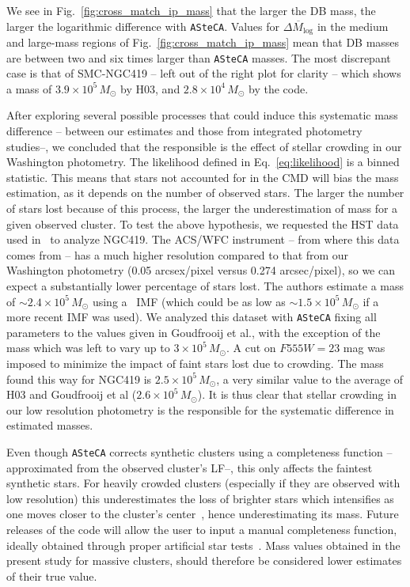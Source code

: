 \documentclass[draft]{aa}
\begin{document}
We see in Fig.~\ref{fig:cross_match_ip_mass} that
the larger the DB mass, the larger the logarithmic difference with
\texttt{ASteCA}. Values for $\overline{\Delta M_{\log}}$ in the medium and
large-mass regions of Fig.~\ref{fig:cross_match_ip_mass} mean that DB masses are
between two and six times larger than \texttt{ASteCA} masses.
%
The most discrepant case is that of SMC-NGC419 -- left out of
the right plot for clarity -- which shows a mass of $3.9{\times}10^5\,M_{\odot}$
by H03, and $2.8{\times}10^4\,M_{\odot}$ by the code.

After exploring several possible processes that could induce this systematic
mass difference -- between our estimates and those from integrated photometry
studies--, we concluded that the responsible is the effect of stellar crowding
in our Washington photometry.
%
The likelihood defined in Eq.~\ref{eq:likelihood} is a binned statistic. This
means that stars not accounted for in the CMD will bias the mass estimation,
as it depends on the number of observed stars. The larger the number of stars
lost because of this process, the larger the underestimation of mass for a given
observed cluster.
%
To test the above hypothesis, we requested the HST data used
in~\cite{Goudfrooij_2014} to analyze NGC419. The ACS/WFC instrument -- from
where this data comes from -- has a much higher resolution compared to that from
our Washington photometry (0.05 arcsex/pixel versus 0.274 arcsec/pixel), so we
can expect a substantially lower percentage of stars lost.
The authors estimate a mass of ${\sim}2.4{\times}10^5\,M_{\odot}$ using
a~\cite{Salpeter_1955} IMF (which could be as low as
${\sim}1.5{\times}10^5\,M_{\odot}$ if a more recent IMF was used).
We analyzed this dataset with \texttt{ASteCA} fixing all parameters to the
values given in Goudfrooij et al., with the exception of the
mass which was left to vary up to $3{\times}10^5\,M_{\odot}$. A cut on $F555W
{=}23$ mag was imposed to minimize the impact of faint stars lost due to
crowding.
%
The mass found this way for NGC419 is $2.5{\times}10^5\,M_{\odot}$, a
very similar value to the average of H03 and Goudfrooij et al
($2.6{\times}10^5\,M_{\odot}$).
%
It is thus clear that stellar crowding in our low resolution photometry is the
responsible for the systematic difference in estimated masses.

Even though \texttt{ASteCA} corrects synthetic clusters using a
completeness function -- approximated from the observed cluster's LF--, this
only affects the faintest synthetic stars. For heavily crowded clusters 
(especially if they are observed with low resolution) this underestimates the
loss of brighter stars which intensifies as one moves closer to the
cluster's center~\citep{Mateo_1988}, hence underestimating its mass.
Future releases of the code will allow the user to input a manual
completeness function, ideally obtained through proper artificial star
tests~\citep[see e.g.,][]{Aparicio_Gallart_1995}.
%
Mass values obtained in the present study for massive clusters, should therefore
be considered lower estimates of their true value.
\end{document}
